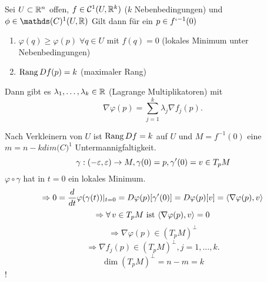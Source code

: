 \documentclass[../ana2.tex]{subfiles}
\begin{document}
\begin{satz}
    Sei \( U \subset \mathbb{R}^n \) offen, \( f \in \mathcal{C}^1(U, \mathbb{R}^k) \) 
    (\(k\) Nebenbedingungen) und \(\phi \in \mathds(C)^1(U, \R)\)
    Gilt dann für ein \(p \in f`^{-1}(0)\)
    \begin{enumerate}
        \item \( \varphi(q) \geq \varphi(p) \;\forall q \in U \) mit
        \( f(q) = 0 \) (lokales Minimum unter Nebenbedingungen)
        \item \( \operatorname{Rang} Df (p) = k \) (maximaler Rang)
    \end{enumerate}
    Dann gibt es \( \lambda_1, \ldots, \lambda_k \in \mathbb{R} \) (Lagrange Multiplikatoren)
    mit 
    \[ \nabla \varphi(p) = \sum_{j=1}^k \lambda_j \nabla f_j(p). \]
\end{satz}
\begin{bew}
    Nach Verkleinern von \(U\) ist \(\operatorname{Rang} Df = k \) 
    auf \(U\) und \(M = f^{-1}(0)\) eine
    \(m=n-k dim \mathcal(C)^1\) Untermannigfaltigkeit.
    \[ \gamma:(-\varepsilon, \varepsilon)\rightarrow M, \gamma(0) = p, \gamma'(0) = v \in T_pM \]
    \( \varphi \circ \gamma \) hat in \( t = 0 \) ein lokales Minimum.
    \[ \Rightarrow 0 = \frac{d}{dt} \varphi(\gamma(t)) \vert_{t=0} 
    = D\varphi(p) [\gamma'(0)] = D\varphi(p)[v] 
    = \langle \nabla \varphi(p), v \rangle \]
    \[ \Rightarrow \forall v \in T_pM \text{ ist } 
    \scalarprod{\nabla \varphi(p)}{v} = 0 \]
    \[ \Rightarrow \nabla \varphi(p) \in (T_pM)^\bot \]    
    \[ \Rightarrow \nabla f_j(p) \in (T_p M)^\bot, j = 1,\ldots,k. \]
    \[ \dim(T_pM)^\bot = n-m = k \]!
\end{bew}
\end{document}
